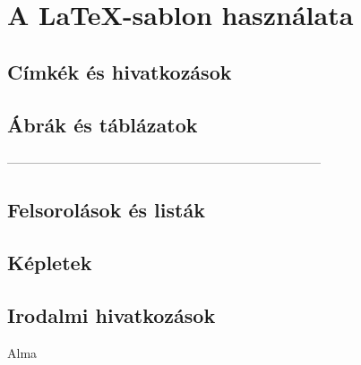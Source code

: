 \chapter{A \LaTeX-sablon használata}

\section{Címkék és hivatkozások}
\section{Ábrák és táblázatok}
---------------------------------------------------------------------------
\section{Felsorolások és listák}
\section{Képletek}

\section{Irodalmi hivatkozások}
Alma \cite{Wettl04}